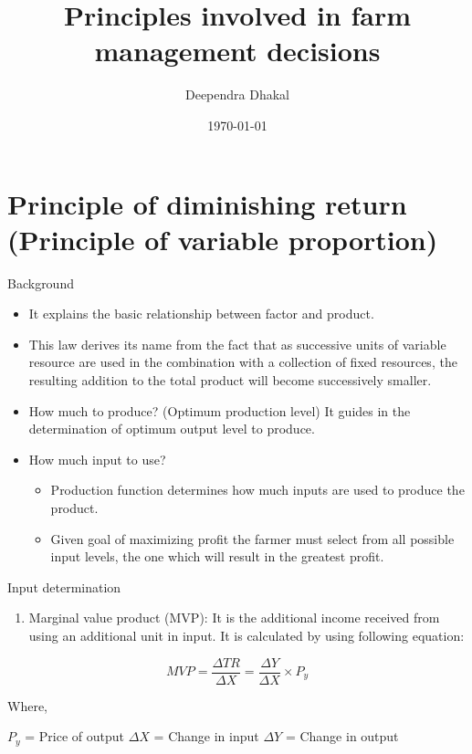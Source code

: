 \documentclass[12pt,ignorenonframetext,aspectratio=169]{beamer}
\title{\insertsectionhead}
  {
    \definecolor{white}{rgb}{0.776,0.357,0.157}
    \definecolor{iqss@orange}{rgb}{1,1,1}
    \ifnum \insertmainframenumber > \insertframenumber
    \frame{
      \frametitle{\iqsssectiontitleheader}
      \tableofcontents[currentsection]
    }
    \else
    \frame{
      \frametitle{Backup Slides}
      \tableofcontents[sectionstyle=shaded/shaded,subsectionstyle=shaded/shaded/shaded]
    }
    \fi
  }
\title[]{Principles involved in farm management decisions}
\author[
        Deependra Dhakal
    ]{Deependra Dhakal}
\institute[
    ]{
    GAASC, Baitadi \and Tribhuwan University
    }
\date[
      \today
  ]{
      \today
        }
\providecommand{\tightlist}{%
  \setlength{\itemsep}{0pt}\setlength{\parskip}{0pt}}
\begin{document}
  \begin{frame}[plain]
  \titlepage
  \end{frame}



\hypertarget{principle-of-diminishing-return-principle-of-variable-proportion}{%
\section{Principle of diminishing return (Principle of variable
proportion)}\label{principle-of-diminishing-return-principle-of-variable-proportion}}

\begin{frame}{Background}
\protect\hypertarget{background}{}
\footnotesize

\begin{itemize}
\tightlist
\item
  It explains the basic relationship between factor and product.
\item
  This law derives its name from the fact that as successive units of
  variable resource are used in the combination with a collection of
  fixed resources, the resulting addition to the total product will
  become successively smaller.
\item
  How much to produce? (Optimum production level) It guides in the
  determination of optimum output level to produce.
\item
  How much input to use?

  \begin{itemize}
  \tightlist
  \item
    Production function determines how much inputs are used to produce
    the product.
  \item
    Given goal of maximizing profit the farmer must select from all
    possible input levels, the one which will result in the greatest
    profit.
  \end{itemize}
\end{itemize}
\end{frame}

\begin{frame}{Input determination}
\protect\hypertarget{input-determination}{}
\begin{enumerate}
\tightlist
\item
  Marginal value product (MVP): It is the additional income received
  from using an additional unit in input. It is calculated by using
  following equation:
\end{enumerate}

\[
MVP = \frac{\Delta TR}{\Delta X} = \frac{\Delta Y}{\Delta X}\times P_y
\] \footnotesize

Where,

\(P_y\) = Price of output \(\Delta X\) = Change in input \(\Delta Y\) =
Change in output
\end{frame}
\end{document}
